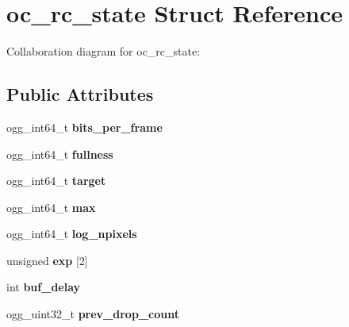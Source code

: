 \hypertarget{structoc__rc__state}{\section{oc\+\_\+rc\+\_\+state Struct Reference}
\label{structoc__rc__state}
}


Collaboration diagram for oc\+\_\+rc\+\_\+state\+:
\subsection*{Public Attributes}
\begin{DoxyCompactItemize}
\item 
\hypertarget{structoc__rc__state_aab3475586fef8b294718ede075617088}{ogg\+\_\+int64\+\_\+t {\bfseries bits\+\_\+per\+\_\+frame}}\label{structoc__rc__state_aab3475586fef8b294718ede075617088}

\item 
\hypertarget{structoc__rc__state_ad7ea23d0edcad1f75aba24d24c61cb83}{ogg\+\_\+int64\+\_\+t {\bfseries fullness}}\label{structoc__rc__state_ad7ea23d0edcad1f75aba24d24c61cb83}

\item 
\hypertarget{structoc__rc__state_a321e5db745d2e7f1b1fb09e98fc08e17}{ogg\+\_\+int64\+\_\+t {\bfseries target}}\label{structoc__rc__state_a321e5db745d2e7f1b1fb09e98fc08e17}

\item 
\hypertarget{structoc__rc__state_a368b04bf8123954708e6f3ccc86d91e7}{ogg\+\_\+int64\+\_\+t {\bfseries max}}\label{structoc__rc__state_a368b04bf8123954708e6f3ccc86d91e7}

\item 
\hypertarget{structoc__rc__state_a072231cac63dd2130b00908731c68f12}{ogg\+\_\+int64\+\_\+t {\bfseries log\+\_\+npixels}}\label{structoc__rc__state_a072231cac63dd2130b00908731c68f12}

\item 
\hypertarget{structoc__rc__state_a5f7ab77f4fd4b808488f2eb8caf036b1}{unsigned {\bfseries exp} \mbox{[}2\mbox{]}}\label{structoc__rc__state_a5f7ab77f4fd4b808488f2eb8caf036b1}

\item 
\hypertarget{structoc__rc__state_a2cfadf043ea49dbac72dd9d5a3426bf0}{int {\bfseries buf\+\_\+delay}}\label{structoc__rc__state_a2cfadf043ea49dbac72dd9d5a3426bf0}

\item 
\hypertarget{structoc__rc__state_a353f8552db264792b5033608357c6515}{ogg\+\_\+uint32\+\_\+t {\bfseries prev\+\_\+drop\+\_\+count}}\label{structoc__rc__state_a353f8552db264792b5033608357c6515}


\end{DoxyCompactItemize}
